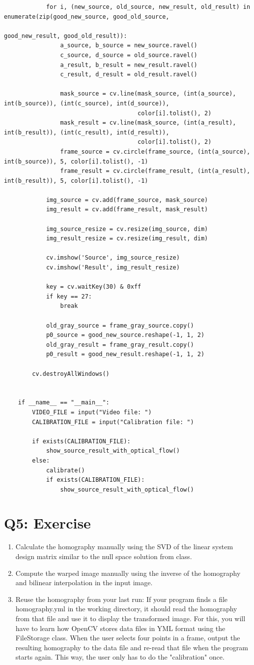 \documentclass[a4paper,12pt]{article}
\begin{document}
\begin{lstlisting}
			for i, (new_source, old_source, new_result, old_result) in enumerate(zip(good_new_source, good_old_source,
																					 good_new_result, good_old_result)):
				a_source, b_source = new_source.ravel()
				c_source, d_source = old_source.ravel()
				a_result, b_result = new_result.ravel()
				c_result, d_result = old_result.ravel()
	
				mask_source = cv.line(mask_source, (int(a_source), int(b_source)), (int(c_source), int(d_source)),
									  color[i].tolist(), 2)
				mask_result = cv.line(mask_source, (int(a_result), int(b_result)), (int(c_result), int(d_result)),
									  color[i].tolist(), 2)
				frame_source = cv.circle(frame_source, (int(a_source), int(b_source)), 5, color[i].tolist(), -1)
				frame_result = cv.circle(frame_result, (int(a_result), int(b_result)), 5, color[i].tolist(), -1)
	
			img_source = cv.add(frame_source, mask_source)
			img_result = cv.add(frame_result, mask_result)
	
			img_source_resize = cv.resize(img_source, dim)
			img_result_resize = cv.resize(img_result, dim)
	
			cv.imshow('Source', img_source_resize)
			cv.imshow('Result', img_result_resize)
	
			key = cv.waitKey(30) & 0xff
			if key == 27:
				break
	
			old_gray_source = frame_gray_source.copy()
			p0_source = good_new_source.reshape(-1, 1, 2)
			old_gray_result = frame_gray_result.copy()
			p0_result = good_new_result.reshape(-1, 1, 2)
	
		cv.destroyAllWindows()
	
	
	if __name__ == "__main__":
		VIDEO_FILE = input("Video file: ")
		CALIBRATION_FILE = input("Calibration file: ")
	
		if exists(CALIBRATION_FILE):
			show_source_result_with_optical_flow()
		else:
			calibrate()
			if exists(CALIBRATION_FILE):
				show_source_result_with_optical_flow()	
\end{lstlisting}

\section{Q5: Exercise}
\begin{enumerate}
	\item Calculate the homography manually using the SVD of the linear system design matrix similar to the null space solution from class.
	\item Compute the warped image manually using the inverse of the homography and bilinear interpolation in the input image.
	\item 	Reuse the homography from your last run: If your program finds a file homography.yml in the working directory, it should read the homography from that file and use it to display the transformed image. For this, you will have to learn how OpenCV stores data files in YML format using the FileStorage class. When the user selects four points in a frame, output the resulting homography to the data file and re-read that file when the program starts again. This way, the user only has to do the "calibration" once.
\end{enumerate}
\end{document}
